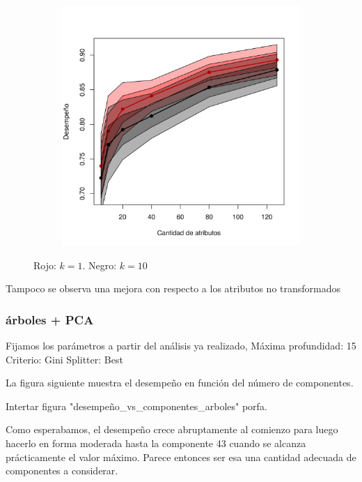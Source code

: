 \documentclass[a4paper,10pt]{article}
\begin{document}
\begin{figure}[H]
  \centering
  \begin{subfigure}[b]{0.4\textwidth}
    \includegraphics[width=\textwidth]{../imagenes/knn}
  \end{subfigure}
  \caption{Rojo: $k=1$. Negro: $k=10$ }
  \label{fig:knn-n_neighbors}
\end{figure}

Tampoco se observa una mejora con respecto a los atributos no transformados

\subsubsection{árboles + PCA}

Fijamos los parámetros a partir del análisis ya realizado,
Máxima profundidad: 15
Criterio: Gini
Splitter: Best

La figura siguiente muestra el desempeño en función del número de componentes.

Intertar figura "desempeño_vs_componentes_arboles" porfa.

Como esperabamos, el desempeño crece abruptamente al comienzo para luego hacerlo en forma moderada hasta la componente 43 cuando se alcanza prácticamente el valor máximo. Parece entonces ser esa una cantidad adecuada de componentes a considerar.
\end{document}
